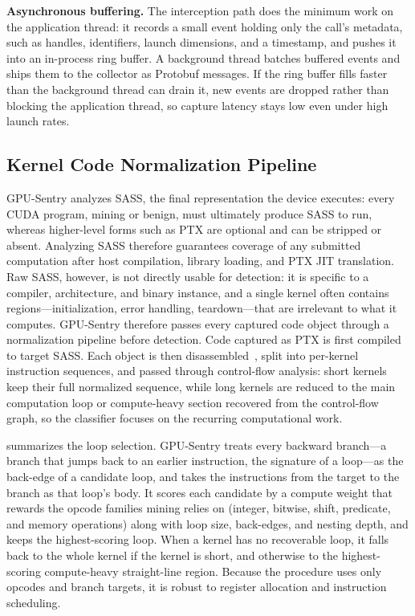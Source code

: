 \textbf{Asynchronous buffering.}
The interception path does the minimum work on the application thread: it records a small event holding only the call's metadata, such as handles, identifiers, launch dimensions, and a timestamp, and pushes it into an in-process ring buffer. A background thread batches buffered events and ships them to the collector as Protobuf messages. If the ring buffer fills faster than the background thread can drain it, new events are dropped rather than blocking the application thread, so capture latency stays low even under high launch rates.

\subsection{Kernel Code Normalization Pipeline}
\label{sec:normalization}

GPU-Sentry analyzes SASS, the final representation the device executes: every CUDA program, mining or benign, must ultimately produce SASS to run, whereas higher-level forms such as PTX are optional and can be stripped or absent. Analyzing SASS therefore guarantees coverage of any submitted computation after host compilation, library loading, and PTX JIT translation. Raw SASS, however, is not directly usable for detection: it is specific to a compiler, architecture, and binary instance, and a single kernel often contains regions---initialization, error handling, teardown---that are irrelevant to what it computes. GPU-Sentry therefore passes every captured code object through a normalization pipeline before detection. Code captured as PTX is first compiled to target SASS. Each object is then disassembled~\cite{nvidiaCudaBinaryUtilities}, split into per-kernel instruction sequences, and passed through control-flow analysis: short kernels keep their full normalized sequence, while long kernels are reduced to the main computation loop or compute-heavy section recovered from the control-flow graph, so the classifier focuses on the recurring computational work.

 summarizes the loop selection. GPU-Sentry treats every backward branch---a branch that jumps back to an earlier instruction, the signature of a loop---as the back-edge of a candidate loop, and takes the instructions from the target to the branch as that loop's body. It scores each candidate by a compute weight that rewards the opcode families mining relies on (integer, bitwise, shift, predicate, and memory operations) along with loop size, back-edges, and nesting depth, and keeps the highest-scoring loop. When a kernel has no recoverable loop, it falls back to the whole kernel if the kernel is short, and otherwise to the highest-scoring compute-heavy straight-line region. Because the procedure uses only opcodes and branch targets, it is robust to register allocation and instruction scheduling.

